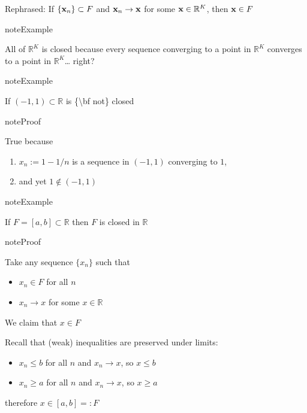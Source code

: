 \documentclass[letterpaper,10pt,english]{jupyterBook}
\begin{document}
\sphinxAtStartPar
Rephrased: If \(\{{\bf x}_n\} \subset F\) and \({\bf x}_n \to {\bf x}\) for some
\({\bf x} \in \mathbb{R}^K\), then \({\bf x} \in F\)

\begin{sphinxadmonition}{note}{Example}

\sphinxAtStartPar
All of \(\mathbb{R}^K\) is closed because every sequence converging to a point in \(\mathbb{R}^K\) converges to a point in \(\mathbb{R}^K\)… right?
\end{sphinxadmonition}

\begin{sphinxadmonition}{note}{Example}

\sphinxAtStartPar
If \((-1, 1) \subset \mathbb{R}\) is \{\textbackslash{}bf not\} closed
\end{sphinxadmonition}

\begin{sphinxadmonition}{note}{Proof}

\sphinxAtStartPar
True because
\begin{enumerate}
%
\item {} 
\sphinxAtStartPar
\(x_n := 1-1/n\) is a sequence in \((-1, 1)\) converging to \(1\),

\item {} 
\sphinxAtStartPar
and yet \(1 \notin (-1, 1)\)

\end{enumerate}
\end{sphinxadmonition}

\begin{sphinxadmonition}{note}{Example}

\sphinxAtStartPar
If \(F = [a, b] \subset \mathbb{R}\) then \(F\) is closed in \(\mathbb{R}\)
\end{sphinxadmonition}

\begin{sphinxadmonition}{note}{Proof}

\sphinxAtStartPar
Take any sequence \(\{x_n\}\) such that
\begin{itemize}
\item {} 
\sphinxAtStartPar
\(x_n \in F\) for all \(n\)

\item {} 
\sphinxAtStartPar
\(x_n \to x\) for some \(x \in \mathbb{R}\)

\end{itemize}

\sphinxAtStartPar
We claim that \(x \in F\)

\sphinxAtStartPar
Recall that (weak) inequalities are preserved under limits:
\begin{itemize}
\item {} 
\sphinxAtStartPar
\(x_n \leq b\) for all \(n\) and \(x_n \to x\), so \(x \leq b\)

\item {} 
\sphinxAtStartPar
\(x_n \geq a\) for all \(n\) and \(x_n \to x\), so \(x \geq a\)

\end{itemize}

\sphinxAtStartPar
therefore \(x \in [a, b] =: F\)
\end{sphinxadmonition}
\end{document}
